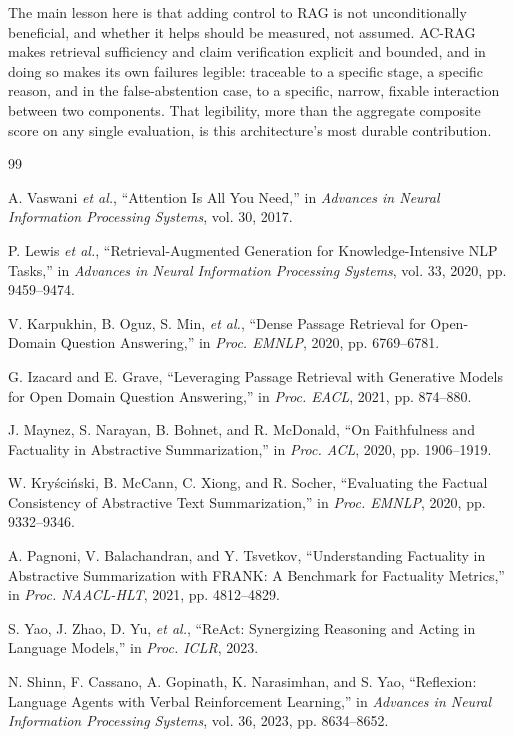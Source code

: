 \documentclass[conference]{IEEEtran}
\begin{document}
The main lesson here is that adding control to RAG is not unconditionally beneficial,
and whether it helps should be measured, not assumed. AC-RAG makes retrieval
sufficiency and claim verification explicit and bounded, and in doing so makes its own
failures legible: traceable to a specific stage, a specific reason, and in the
false-abstention case, to a specific, narrow, fixable interaction between two
components. That legibility, more than the aggregate composite score on any single
evaluation, is this architecture's most durable contribution.

\begin{thebibliography}{99}

A. Vaswani \emph{et al.}, ``Attention Is All You Need,'' in \emph{Advances in Neural
Information Processing Systems}, vol. 30, 2017.

P. Lewis \emph{et al.}, ``Retrieval-Augmented Generation for Knowledge-Intensive NLP
Tasks,'' in \emph{Advances in Neural Information Processing Systems}, vol. 33, 2020,
pp. 9459--9474.

V. Karpukhin, B. Oguz, S. Min, \emph{et al.}, ``Dense Passage Retrieval for Open-Domain
Question Answering,'' in \emph{Proc. EMNLP}, 2020, pp. 6769--6781.

G. Izacard and E. Grave, ``Leveraging Passage Retrieval with Generative Models for Open
Domain Question Answering,'' in \emph{Proc. EACL}, 2021, pp. 874--880.

J. Maynez, S. Narayan, B. Bohnet, and R. McDonald, ``On Faithfulness and Factuality in
Abstractive Summarization,'' in \emph{Proc. ACL}, 2020, pp. 1906--1919.

W. Kry\'sci\'nski, B. McCann, C. Xiong, and R. Socher, ``Evaluating the Factual
Consistency of Abstractive Text Summarization,'' in \emph{Proc. EMNLP}, 2020,
pp. 9332--9346.

A. Pagnoni, V. Balachandran, and Y. Tsvetkov, ``Understanding Factuality in Abstractive
Summarization with FRANK: A Benchmark for Factuality Metrics,'' in \emph{Proc.
NAACL-HLT}, 2021, pp. 4812--4829.

S. Yao, J. Zhao, D. Yu, \emph{et al.}, ``ReAct: Synergizing Reasoning and Acting in
Language Models,'' in \emph{Proc. ICLR}, 2023.

N. Shinn, F. Cassano, A. Gopinath, K. Narasimhan, and S. Yao, ``Reflexion: Language
Agents with Verbal Reinforcement Learning,'' in \emph{Advances in Neural Information
Processing Systems}, vol. 36, 2023, pp. 8634--8652.


\end{thebibliography}
\end{document}
